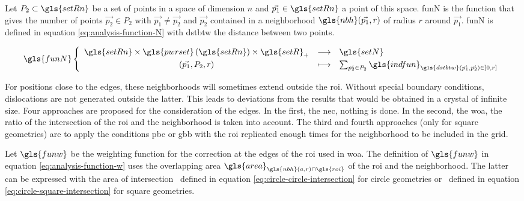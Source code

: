 \medskip


\bigskip

Let \( P_2 \subset \gls{setRn} \) be a set of points in a space of dimension \( n \) and \( \vec{p_1} \in \gls{setRn} \) a point of this space.
\gls{funN} is the function that gives the number of points \( \vec{p_2} \in P_2 \) with \( \vec{p_1} \neq \vec{p_2} \) and \( \vec{p_2} \) contained in a neighborhood \( \gls{nbh}(\vec{p_1}, r) \) of radius \( r \) around \( \vec{p_1} \).
\gls{funN} is defined in equation \eqref{eq:analysis-function-N} with \gls{dstbtw} the distance between two points.

\begin{equation}\label{eq:analysis-function-N}
  \define{
    \gls{funN}
  }{
    \gls{setRn} \times \gls{pwrset} \left( \gls{setRn} \right) \times \gls{setR}_+
  }{
    \gls{setN}
  }{
    (\vec{p_1}, P_2, r)
  }{
    \sum_{\vec{p_2} \in P_2} \gls{indfun}_{\gls{dstbtw}(\vec{p_1}, \vec{p_2}) \in ]0, r]}
  }
\end{equation}

\medskip

For positions close to the edges, these neighborhoods will sometimes extend outside the \gls{roi}.
Without special boundary conditions, dislocations are not generated outside the latter.
This leads to deviations from the results that would be obtained in a crystal of infinite size.
Four approaches are proposed for the consideration of the edges.
In the first, the \gls{nec}, nothing is done.
In the second, the \gls{woa}, the ratio of the intersection of the \gls{roi} and the neighborhood is taken into account.
The third and fourth approaches (only for square geometries) are to apply the conditions \gls{pbc} or \gls{gbb} with the \gls{roi} replicated enough times for the neighborhood to be included in the grid.


Let \( \gls{funw} \) be the weighting function for the correction at the edges of the \gls{roi} used in \gls{woa}.
The definition of \( \gls{funw} \) in equation \eqref{eq:analysis-function-w} uses the overlapping area \( \gls{area}_{\gls{nbh}(a, r) \cap \gls{roi} } \) of the \gls{roi} and the neighborhood.
The latter can be expressed with the area of intersection \circir \ defined in equation \eqref{eq:circle-circle-intersection} for circle geometries or \cirsqr \ defined in equation \eqref{eq:circle-square-intersection} for square geometries.

